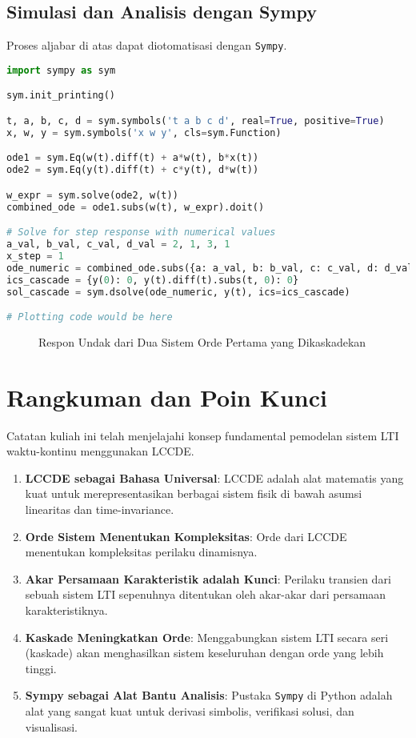\documentclass[12pt, a4paper]{article}
\begin{document}
\subsection{Simulasi dan Analisis dengan Sympy}
Proses aljabar di atas dapat diotomatisasi dengan \texttt{Sympy}.
\begin{lstlisting}[language=Python, caption={Kode Python untuk analisis sistem kaskade}, label={lst:cascade}]
import sympy as sym

sym.init_printing()

t, a, b, c, d = sym.symbols('t a b c d', real=True, positive=True)
x, w, y = sym.symbols('x w y', cls=sym.Function)

ode1 = sym.Eq(w(t).diff(t) + a*w(t), b*x(t))
ode2 = sym.Eq(y(t).diff(t) + c*y(t), d*w(t))

w_expr = sym.solve(ode2, w(t))
combined_ode = ode1.subs(w(t), w_expr).doit()

# Solve for step response with numerical values
a_val, b_val, c_val, d_val = 2, 1, 3, 1
x_step = 1
ode_numeric = combined_ode.subs({a: a_val, b: b_val, c: c_val, d: d_val, x(t): x_step}).doit()
ics_cascade = {y(0): 0, y(t).diff(t).subs(t, 0): 0}
sol_cascade = sym.dsolve(ode_numeric, y(t), ics=ics_cascade)

# Plotting code would be here
\end{lstlisting}

\begin{figure}[H]
    \centering
    \caption{Respon Undak dari Dua Sistem Orde Pertama yang Dikaskadekan}
    \label{fig:cascade-response}
\end{figure}

\section{Rangkuman dan Poin Kunci}
Catatan kuliah ini telah menjelajahi konsep fundamental pemodelan sistem LTI waktu-kontinu menggunakan LCCDE.
\begin{enumerate}
    \item \textbf{LCCDE sebagai Bahasa Universal}: LCCDE adalah alat matematis yang kuat untuk merepresentasikan berbagai sistem fisik di bawah asumsi linearitas dan time-invariance.
    \item \textbf{Orde Sistem Menentukan Kompleksitas}: Orde dari LCCDE menentukan kompleksitas perilaku dinamisnya.
    \item \textbf{Akar Persamaan Karakteristik adalah Kunci}: Perilaku transien dari sebuah sistem LTI sepenuhnya ditentukan oleh akar-akar dari persamaan karakteristiknya.
    \item \textbf{Kaskade Meningkatkan Orde}: Menggabungkan sistem LTI secara seri (kaskade) akan menghasilkan sistem keseluruhan dengan orde yang lebih tinggi.
    \item \textbf{Sympy sebagai Alat Bantu Analisis}: Pustaka \texttt{Sympy} di Python adalah alat yang sangat kuat untuk derivasi simbolis, verifikasi solusi, dan visualisasi.
\end{enumerate}
\end{document}
